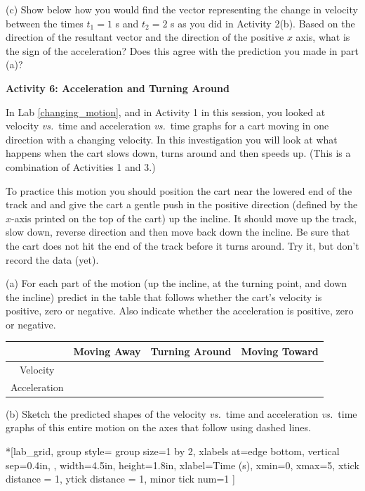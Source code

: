 (c) Show below how you would find the vector representing the change in velocity
between the times $t_1 = 1$ s and $t_2 = 2$ s as you did in Activity 2(b). Based on the 
direction of the resultant vector and the direction of the positive $x$ axis, 
what is the sign of the acceleration?  Does this agree with the prediction you made in part (a)?
\answerspace{10mm}

\pagebreak[2]
\textbf{Activity 6: Acceleration and Turning Around }

In Lab \ref{changing_motion}, and in Activity 1 in this session, you looked at
velocity \textit{vs.}~time and acceleration \textit{vs.}~time graphs for a cart moving in one
direction with a changing velocity. In this investigation you will look at what
happens when the cart slows down, turns around and then speeds up. (This is a
combination of Activities 1 and 3.)

To practice this motion you should position the cart near the lowered end of the track and
and give the cart a gentle push in the positive direction (defined by the $x$-axis printed on the top of the cart) up the incline. It should move up the track, slow down, reverse direction and then move back down the incline. Be sure that the cart does not hit the end of the track before it turns around. Try it, but don't record the data (yet).

(a) For each part of the motion (up the incline, at the turning point,
and down the incline) predict in the table that follows whether the cart's velocity
is positive, zero or negative. Also indicate whether the acceleration is
positive, zero or negative.

\vspace{0.3cm}
{\centering \begin{tabular}{|c|c|c|c|}
\hline 
&
Moving Away&
Turning Around&
Moving Toward\\
\hline 
Velocity&
&
&
\\
\hline 
Acceleration&
&
&
\\
\hline 
\end{tabular}\par}
\vspace{0.3cm}

(b) Sketch the predicted shapes of the velocity \textit{vs.}~time and acceleration 
\textit{vs.}~time graphs of this entire motion on the axes that follow using dashed lines.

\begin{lab_groupplot}*{}[lab_grid,
	group style={
		group size=1 by 2,
		xlabels at=edge bottom,
		vertical sep=0.4in,
		},
	width=4.5in,  height=1.8in,
	xlabel=Time (s),
	xmin=0, xmax=5,
	xtick distance = 1, 
	ytick distance = 1, 
	minor tick num=1
	]
\nextgroupplot[
	ymin=-1,ymax=1, 
	ylabel={Velocity (m/s)},
	]
\nextgroupplot[
	ymin=-1,ymax=1, 
	ylabel={Acceleration (m/s$^2$)},
	]
\end{lab_groupplot}

